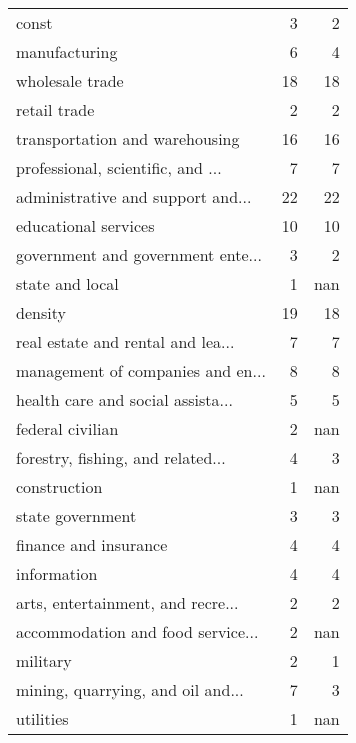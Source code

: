 \begin{tabular}{lrr}
\hline
 const                             &  3 &   2 \\
 manufacturing                     &  6 &   4 \\
 wholesale trade                   & 18 &  18 \\
 retail trade                      &  2 &   2 \\
 transportation and warehousing    & 16 &  16 \\
 professional, scientific, and ... &  7 &   7 \\
 administrative and support and... & 22 &  22 \\
 educational services              & 10 &  10 \\
 government and government ente... &  3 &   2 \\
 state and local                   &  1 & nan \\
 density                           & 19 &  18 \\
 real estate and rental and lea... &  7 &   7 \\
 management of companies and en... &  8 &   8 \\
 health care and social assista... &  5 &   5 \\
 federal civilian                  &  2 & nan \\
 forestry, fishing, and related... &  4 &   3 \\
 construction                      &  1 & nan \\
 state government                  &  3 &   3 \\
 finance and insurance             &  4 &   4 \\
 information                       &  4 &   4 \\
 arts, entertainment, and recre... &  2 &   2 \\
 accommodation and food service... &  2 & nan \\
 military                          &  2 &   1 \\
 mining, quarrying, and oil and... &  7 &   3 \\
 utilities                         &  1 & nan \\
\hline
\end{tabular}